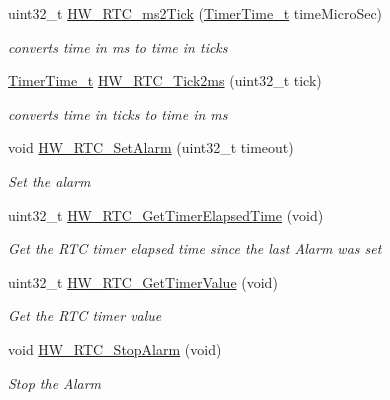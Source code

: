 \begin{DoxyCompactItemize}
uint32\+\_\+t \mbox{\hyperlink{group___lory_s_d_k___r_t_c___functions_gab105bfcf0c8b346a1b20b158b8f8a86e}{H\+W\+\_\+\+R\+T\+C\+\_\+ms2\+Tick}} (\mbox{\hyperlink{utilities_8h_a4215ca43d3e953099ea758ce428599d0}{Timer\+Time\+\_\+t}} time\+Micro\+Sec)
\begin{DoxyCompactList}\small\item\em converts time in ms to time in ticks \end{DoxyCompactList}\item 
\mbox{\hyperlink{utilities_8h_a4215ca43d3e953099ea758ce428599d0}{Timer\+Time\+\_\+t}} \mbox{\hyperlink{group___lory_s_d_k___r_t_c___functions_ga8db2858eda135777ea359e20185c8524}{H\+W\+\_\+\+R\+T\+C\+\_\+\+Tick2ms}} (uint32\+\_\+t tick)
\begin{DoxyCompactList}\small\item\em converts time in ticks to time in ms \end{DoxyCompactList}\item 
void \mbox{\hyperlink{group___lory_s_d_k___r_t_c___functions_ga09cec56d54c13de658fafdd003390771}{H\+W\+\_\+\+R\+T\+C\+\_\+\+Set\+Alarm}} (uint32\+\_\+t timeout)
\begin{DoxyCompactList}\small\item\em Set the alarm \end{DoxyCompactList}\item 
uint32\+\_\+t \mbox{\hyperlink{group___lory_s_d_k___r_t_c___functions_ga7961116aa831950b62a413ecbbcfb02a}{H\+W\+\_\+\+R\+T\+C\+\_\+\+Get\+Timer\+Elapsed\+Time}} (void)
\begin{DoxyCompactList}\small\item\em Get the R\+TC timer elapsed time since the last Alarm was set \end{DoxyCompactList}\item 
uint32\+\_\+t \mbox{\hyperlink{group___lory_s_d_k___r_t_c___functions_gad0d80bf1ac3a9704f4b4b9d672f38daa}{H\+W\+\_\+\+R\+T\+C\+\_\+\+Get\+Timer\+Value}} (void)
\begin{DoxyCompactList}\small\item\em Get the R\+TC timer value \end{DoxyCompactList}\item 
void \mbox{\hyperlink{group___lory_s_d_k___r_t_c___functions_ga227be06e4dc1332d46ff12519db183b5}{H\+W\+\_\+\+R\+T\+C\+\_\+\+Stop\+Alarm}} (void)
\begin{DoxyCompactList}\small\item\em Stop the Alarm \end{DoxyCompactList}\item 

\end{DoxyCompactItemize}
